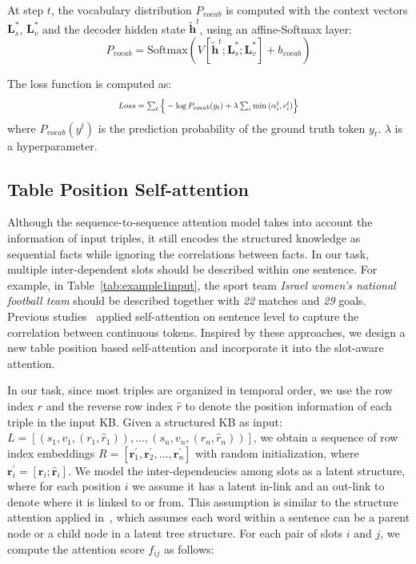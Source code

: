 \documentclass[11pt,a4paper]{article}
\begin{document}
At step $t$, the vocabulary distribution $P_{vocab}$ is computed with the context vectors $\textbf{L}_{s}^{*}$, $\textbf{L}_{v}^{*}$ and the decoder hidden state $\tilde{\textbf{h}}^t$, using an affine-Softmax layer:
\begin{displaymath}
P_{vocab} = \text{Softmax}\left(V[\tilde{\textbf{h}}^t;\textbf{L}_{s}^{*};\textbf{L}_{v}^{*}]+b_{vocab}\right)
\label{eq3}
\end{displaymath}

The loss function is computed as:
\begin{displaymath}
\resizebox{.48 \textwidth}{!}{
$Loss = \sum\nolimits_{t} \Big\{-\log{P_{vocab}(y_t)} + \lambda\sum\nolimits_{i}\min{\left(\alpha^t_i,c^t_i\right)} \Big\} $
}
\end{displaymath}
where $P_{vocab}(y^t)$ is the prediction probability of the ground truth token $y_t$. $\lambda$ is a hyperparameter.



\subsection{Table Position Self-attention}
Although the sequence-to-sequence attention model takes into account the information of input triples, it still encodes the structured knowledge as sequential facts while ignoring the correlations between facts. In our task, multiple inter-dependent slots should be described within one sentence. For example, in Table~\ref{tab:example1input}, the sport team \textit{Israel women's national football team} should be described together with \textit{22} matches and \textit{29} goals.
Previous studies~\cite{lin2017structured,vaswani2017attention} applied self-attention on sentence level to capture the correlation between continuous tokens. Inspired by these approaches, we design a new table position based self-attention and incorporate it into the slot-aware attention.



In our task, since most triples are organized in temporal order, we use the row index $r$ and the reverse row index $\hat{r}$ to denote the position information of each triple in the input KB. Given a structured KB as input: $L=[(s_1, v_1, (r_1, \hat{r}_1)), ..., (s_n, v_n, (r_n, \hat{r}_n))]$, we obtain a sequence of row index embeddings $R=[\textbf{r}_{1}^{'}, \textbf{r}_{2}^{'}, ..., \textbf{r}_{n}^{'}]$ with random initialization, where $\textbf{r}_{i}^{'} = [\textbf{r}_i; \hat{\textbf{r}}_i]$. We model the inter-dependencies among slots as a latent structure, where for each position $i$ we assume it has a latent in-link and an out-link to denote where it is linked to or from. This assumption is similar to the structure attention applied in~, which assumes each word within a sentence can be a parent node or a child node in a latent tree structure. For each pair of slots $i$ and $j$, we compute the attention score $f_{ij}$ as follows:
\end{document}
